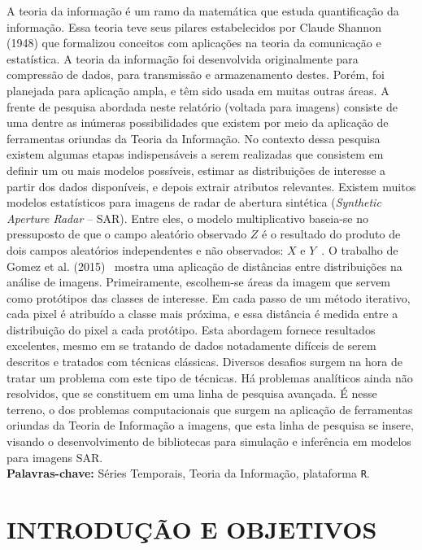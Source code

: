 \documentclass[12pt,letterpaper]{article}
\begin{document}
	A teoria da informação é um ramo da matemática que estuda quantificação da informação. Essa teoria teve seus pilares estabelecidos por Claude Shannon (1948) que formalizou conceitos com aplicações na teoria da comunicação e estatística. A teoria da informação foi desenvolvida originalmente para compressão de dados, para transmissão e armazenamento destes. Porém, foi planejada para aplicação ampla, e têm sido usada em muitas outras áreas. A frente de pesquisa abordada neste relatório (voltada para imagens) consiste de uma dentre as inúmeras possibilidades que existem por meio da aplicação de ferramentas oriundas da Teoria da Informação. No contexto dessa pesquisa existem algumas etapas indispensáveis a serem realizadas que consistem em definir um ou mais modelos possíveis, estimar as distribuições de interesse a partir dos dados disponíveis, e depois extrair atributos relevantes. Existem muitos modelos estatísticos para imagens de radar de abertura sintética (\textit{Synthetic Aperture Radar} -- SAR). Entre eles, o modelo multiplicativo baseia-se no pressuposto de que o campo aleatório observado $Z$ é o resultado do produto de dois campos aleatórios independentes e não observados: $X$ e $Y$~\cite{ClassificationSARImages}. O trabalho de Gomez et al. (2015)~\cite{Gomez} mostra uma aplicação de distâncias entre distribuições na análise de imagens. Primeiramente, escolhem-se áreas da imagem que servem como protótipos das classes de interesse. Em cada passo de um método iterativo, cada pixel é atribuído a classe mais próxima, e essa distância é medida entre a distribuição do pixel a cada protótipo. Esta abordagem fornece resultados excelentes, mesmo em se tratando de dados notadamente difíceis de serem descritos e tratados com técnicas clássicas. Diversos desafios surgem na hora de tratar um problema com este tipo de técnicas. Há problemas analíticos ainda não resolvidos, que se constituem em uma linha de pesquisa avançada. É nesse terreno, o dos problemas computacionais que surgem na aplicação de ferramentas oriundas da Teoria de Informação a imagens, que esta linha de pesquisa se insere, visando o desenvolvimento de bibliotecas para simulação e inferência em modelos para imagens SAR.\\

\textbf{Palavras-chave:} Séries Temporais, Teoria da Informação, plataforma \texttt R.


\newpage
\section*{\centering \textbf{INTRODUÇÃO E OBJETIVOS}} %
\end{document}
